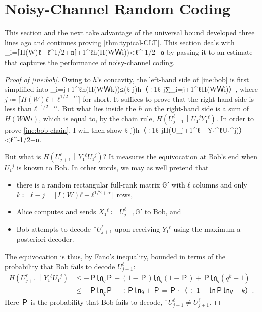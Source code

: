 \documentclass[openany]{amsbook}
\numberwithin{equation}{chapter}
\numberwithin{figure}{chapter}
\numberwithin{table}{chapter}
\def\[#1\]{\begin{equation*}{#1}\end{equation*}}
\theoremstyle{definition}	理dfn:Definition~?s			理exa:Example~?s
\theoremstyle{remark}		理cla:Claim~?s				理rem:Remark~?s
\def\tagcopy#1{\tag{\eqref{#1}'s copy}}
\begin{document}
\section{Noisy-Channel Random Coding}\label{sec:gallager}

	This section and the next take advantage of the universal bound developed
	three lines ago and continues proving \cref{thm:typical-CLT}.
	This section deals with
	\[∑_{i=⌈H(W)ℓ+ℓ^{1/2+α}⌉+1}^ℓh(H(WＷi))<ℓ^{-1/2+α}\tagcopy{ine:bob}\]
	by passing it to an estimate that captures the performance of noisy-channel coding.
	
	\begin{proof}[Proof of \cref{ine:bob}]
		Owing to $h$'s concavity, the left-hand side
		of \cref{ine:bob} is first simplified into
		\[∑_{i=j+1}^ℓh(H(WＷk))≤(ℓ-j)h（÷1{ℓ-j}∑_{i=j+1}^ℓH(WＷi)）,
			\label{ine:bob-chain}\]
		where $j≔⌈H(W)ℓ+ℓ^{1/2+α}⌉$ for short.
		It suffices to prove that the right-hand side is less than $ℓ^{-1/2+α}$.
		But what lies inside the $h$ on the right-hand side is a sum of $H(WＷi)$,
		which is equal to, by the chain rule, $H(U_{j+1}^ℓ｜U₁^jY₁^ℓ)$.
		In order to prove \cref{ine:bob-chain}, I will then show
		\[(ℓ-j)h（÷1{ℓ-j}H(U_{j+1}^ℓ｜Y₁^ℓU₁^j)）<ℓ^{-1/2+α}.\label{ine:bob-block}\]
		
		But what is $H(U_{j+1}^ℓ｜Y₁^ℓU₁^j)$?
		It measures the equivocation at Bob's end when $U₁^j$ is known to Bob.
		In other words, we may as well pretend that
		\begin{itemize}
			\item	there is a random rectangular full-rank matrix $𝔾'$ with
					$ℓ$ columns and only $k≔ℓ-j=⌊I(W)ℓ-ℓ^{1/2+α}⌋$ rows,
			\item	Alice computes and sends $X₁^ℓ≔U_{j+1}^ℓ𝔾'$ to Bob, and
			\item	Bob attempts to decode $ˆU_{j+1}^ℓ$ upon receiving $Y₁^ℓ$ using
					the maximum a posteriori decoder.
		\end{itemize}
		The equivocation is thus, by Fano's inequality,
		bounded in terms of the probability that Bob fails to decode $U_{j+1}^ℓ$:
		\begin{align*}
			H(U_{j+1}^ℓ｜Y₁^ℓU₁^j)
			&	≤-Ｐ㏑_qＰ-(1-Ｐ)㏑_q(1-Ｐ)+Ｐ㏑_q(q^k-1)	\\
			&	≤-Ｐ㏑_qＰ+÷{Ｐ}{㏑q}+Ｐ=Ｐ·（÷{1-㏑Ｐ}{㏑q}+k）.	\label{ine:Fano}
		\end{align*}
		Here $Ｐ$ is the probability that Bob fails to decode, $ˆU_{j+1}^ℓ≠U_{j+1}^ℓ$.
		

\end{proof}
\end{document}
